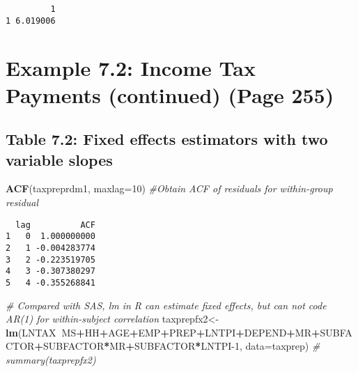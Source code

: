 \documentclass[]{book}
\newenvironment{Shaded}{\begin{snugshade}}{\end{snugshade}}
\newcommand{\CommentTok}[1]{\textcolor[rgb]{0.56,0.35,0.01}{\textit{#1}}}
\newcommand{\DataTypeTok}[1]{\textcolor[rgb]{0.13,0.29,0.53}{#1}}
\newcommand{\DecValTok}[1]{\textcolor[rgb]{0.00,0.00,0.81}{#1}}
\newcommand{\KeywordTok}[1]{\textcolor[rgb]{0.13,0.29,0.53}{\textbf{#1}}}
\newcommand{\NormalTok}[1]{#1}
\newcommand{\OperatorTok}[1]{\textcolor[rgb]{0.81,0.36,0.00}{\textbf{#1}}}
\begin{document}
\begin{verbatim}
         1
1 6.019006
\end{verbatim}

\hypertarget{example-7.2-income-tax-payments-continued-page-255}{%
\section{Example 7.2: Income Tax Payments (continued) (Page 255)}\label{example-7.2-income-tax-payments-continued-page-255}}

\hypertarget{table-7.2-fixed-effects-estimators-with-two-variable-slopes}{%
\subsection{Table 7.2: Fixed effects estimators with two variable slopes}\label{table-7.2-fixed-effects-estimators-with-two-variable-slopes}}

\begin{Shaded}
\begin{Highlighting}[]
\KeywordTok{ACF}\NormalTok{(taxpreprdm1, }\DataTypeTok{maxlag=}\DecValTok{10}\NormalTok{) }\CommentTok{#Obtain ACF of residuals for within-group residual}
\end{Highlighting}
\end{Shaded}

\begin{verbatim}
  lag          ACF
1   0  1.000000000
2   1 -0.004283774
3   2 -0.223519705
4   3 -0.307380297
5   4 -0.355268841
\end{verbatim}

\begin{Shaded}
\begin{Highlighting}[]
\CommentTok{# Compared with SAS, lm in R can estimate fixed effects, but can not code AR(1) for within-subject correlation}
\NormalTok{taxprepfx2<-}\KeywordTok{lm}\NormalTok{(LNTAX}\OperatorTok{~}\NormalTok{MS}\OperatorTok{+}\NormalTok{HH}\OperatorTok{+}\NormalTok{AGE}\OperatorTok{+}\NormalTok{EMP}\OperatorTok{+}\NormalTok{PREP}\OperatorTok{+}\NormalTok{LNTPI}\OperatorTok{+}\NormalTok{DEPEND}\OperatorTok{+}\NormalTok{MR}\OperatorTok{+}\NormalTok{SUBFACTOR}\OperatorTok{+}\NormalTok{SUBFACTOR}\OperatorTok{*}\NormalTok{MR}\OperatorTok{+}\NormalTok{SUBFACTOR}\OperatorTok{*}\NormalTok{LNTPI}\DecValTok{-1}\NormalTok{, }\DataTypeTok{data=}\NormalTok{taxprep)  }
\CommentTok{# summary(taxprepfx2)}
\end{Highlighting}
\end{Shaded}
\end{document}
